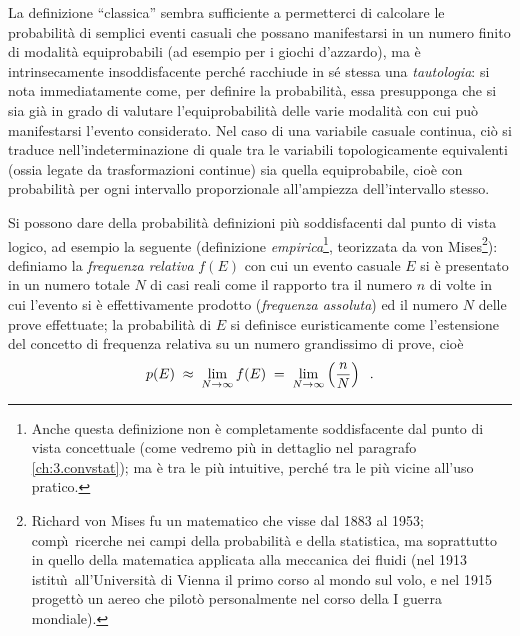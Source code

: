 La definizione ``classica'' sembra sufficiente a permetterci
di calcolare le probabilit\`a di semplici eventi casuali che
possano manifestarsi in un numero finito di modalit\`a
equiprobabili (ad esempio per i giochi d'azzardo), ma \`e
intrinsecamente insoddisfacente perch\'e racchiude in s\'e
stessa una \emph{tautologia}: si nota immediatamente come,
per definire la probabilit\`a, essa presupponga che si sia
gi\`a in grado di valutare l'equiprobabilit\`a delle varie
modalit\`a con cui pu\`o manifestarsi l'evento considerato.
Nel caso di una variabile casuale continua, ci\`o si traduce
nell'indeterminazione di quale tra le variabili
topologicamente equivalenti (ossia legate da trasformazioni
continue) sia quella equiprobabile, cio\`e con probabilit\`a
per ogni intervallo proporzionale all'ampiezza
dell'intervallo stesso.

Si possono dare della probabilit\`a definizioni pi\`u
soddisfacenti dal punto di vista logico, ad esempio la
seguente (definizione
\emph{empirica}\/\thinspace\footnote{Anche questa
  definizione non \`e completamente soddisfacente dal punto
  di vista concettuale (come vedremo pi\`u in dettaglio nel
  paragrafo \ref{ch:3.convstat}); ma \`e tra le pi\`u
  intuitive, perch\'e tra le pi\`u vicine all'uso pratico.},
teorizzata da von%
Mises\/\footnote{Richard von Mises fu un matematico che
  visse dal 1883 al 1953; comp\`\i\ ricerche nei campi della
  probabilit\`a e della statistica, ma soprattutto in quello
  della matematica applicata alla meccanica dei fluidi (nel
  1913 istitu\`\i\ all'Universit\`a di Vienna il primo corso
  al mondo sul volo, e nel 1915 progett\`o un aereo che
  pilot\`o personalmente nel corso della I guerra
  mondiale).}):%
definiamo la \emph{frequenza relativa}%
$f(E)$ con cui un evento casuale $E$ si \`e presentato in un
numero totale $N$ di casi reali come il rapporto tra il
numero $n$ di volte in cui l'evento si \`e effettivamente
prodotto (\emph{frequenza assoluta})%
ed il numero $N$ delle prove effettuate; la probabilit\`a di
$E$ si definisce euristicamente come l'estensione del
concetto di frequenza relativa su un numero grandissimo di
prove, cio\`e
\begin{equation*}
  p(E) \; \approx \; \lim_{N \rightarrow \infty} f(E)
  \; = \; \lim_{N \rightarrow \infty}
  \left( \frac{n}{N} \right) \;\; .
\end{equation*}%

